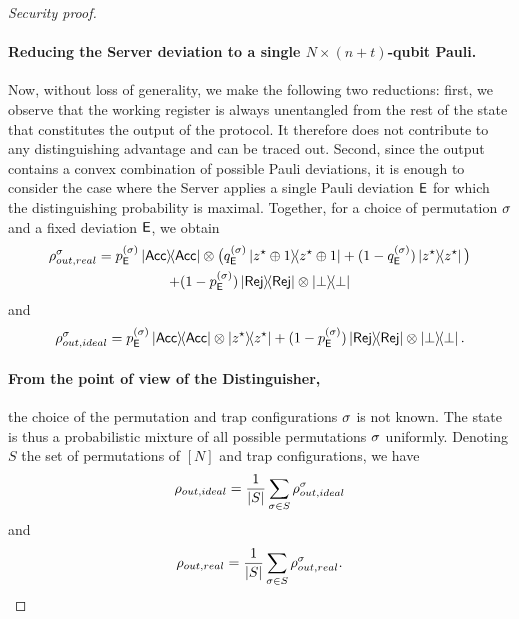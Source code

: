 \begin{proof}[Security proof]
    \paragraph{Reducing the Server deviation to a single $N\times(n+t)$-qubit Pauli.}
    Now, without loss of generality, we make the following two reductions: first, we observe that the working register is always unentangled from the rest of the state that constitutes the output of the protocol. It therefore does not contribute to any distinguishing advantage and can be traced out. Second, since the output contains a convex combination of possible Pauli deviations, it is enough to consider the case where the Server applies a single Pauli deviation $\mathsf{E}$ for which the distinguishing probability is maximal. Together, for a choice of permutation $\sigma$ and a fixed deviation $\mathsf{E}$, we obtain
        \begin{multline}
            \rho_{out, real}^\perm
            =
            p_{\E}^{(\perm)}\ketbra\Acc
                \otimes\big(
                    q^{(\perm)}_{\E}\ketbra{z^\star\oplus 1}
                    +
                    (1-q^{(\perm)}_{\E})\ketbra{z^\star}
                \big)
                \\
                +
                (1-p_{\E}^{(\perm)})
                \ketbra\Rej\otimes \ketbra \perp
        \end{multline}
        and
        \begin{equation}
            \rho_{out, ideal}^\perm
            =
                p_{\E}^{(\perm)}\ketbra\Acc
                \otimes\ketbra{z^\star}
                +
                (1-p_{\E}^{(\perm)})
                \ketbra\Rej\otimes \ketbra \perp.
        \end{equation}

         \paragraph{From the point of view of the Distinguisher,} the choice of the permutation and trap configurations $\sigma$ is not known. The state is thus a probabilistic mixture of all possible permutations $\sigma$ uniformly. Denoting $S$ the set of permutations of $[N]$ and trap configurations, we have
        \begin{equation}
            \rho_{out, ideal}=
            \frac{1}{|S|}
            \sum_{\sigma \in S} \rho_{out, ideal}^\sigma
        \end{equation}
        and
        \begin{equation}
            \rho_{out, real}=
            \frac{1}{|S|}
            \sum_{\sigma \in S} \rho_{out, real}^\sigma.
        \end{equation}


\end{proof}

